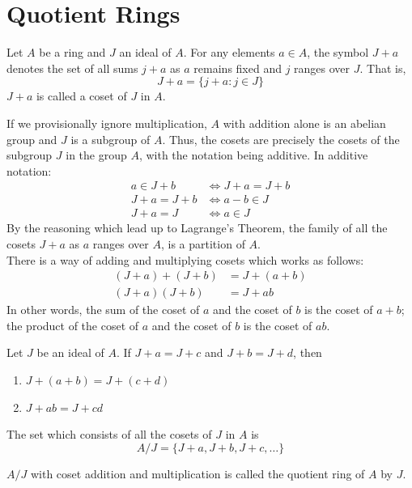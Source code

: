 \documentclass[12pt]{article}
\begin{document}
\section{Quotient Rings}

\begin{definition} Let $A$ be a ring and $J$ an ideal of $A$. For any elements $a \in A$, the symbol $J + a$ denotes the set of all sums $j+a$ as $a$ remains fixed and $j$ ranges over $J$. That is, $$ J + a = \{j + a: j \in J\}$$ $J+a$ is called a coset of $J$ in $A$. \end{definition} 

If we provisionally ignore multiplication, $A$ with addition alone is an abelian group and $J$ is a subgroup of $A$. Thus, the cosets are precisely the cosets of the subgroup $J$ in the group $A$, with the notation being additive. In additive notation: $$ \begin{aligned} a \in J + b &\iff J + a = J + b \\ J + a = J + b &\iff a - b \in J \\ J + a = J &\iff a \in J \end{aligned} $$ 
By the reasoning which lead up to Lagrange's Theorem, the family of all the cosets $J + a$ as $a$ ranges over $A$, is a partition of $A$. \\
There is a way of adding and multiplying cosets which works as follows: $$ \begin{aligned} (J + a) + (J + b) &= J + (a + b) \\ (J + a)(J + b) &= J + ab \end{aligned} $$ In other words, the sum of the coset of $a$ and the coset of $b$ is the coset of $a+b$; the product of the coset of $a$ and the coset of $b$ is the coset of $ab$. 

\begin{theorem} Let $J$ be an ideal of $A$. If $J + a = J+c$ and $J+b = J+d$, then \begin{enumerate} 
\item $J + (a + b) = J + (c + d) $ 
\item $J + ab = J + cd $ \end{enumerate} \end{theorem} 

\begin{definition} The set which consists of all the cosets of $J$ in $A$ is $$ A/J = \{J+a, J+b, J+c, \dots\}$$ \end{definition} 

\begin{theorem} $A / J$ with coset addition and multiplication is called the quotient ring of $A$ by $J$. \end{theorem} 
\end{document}
